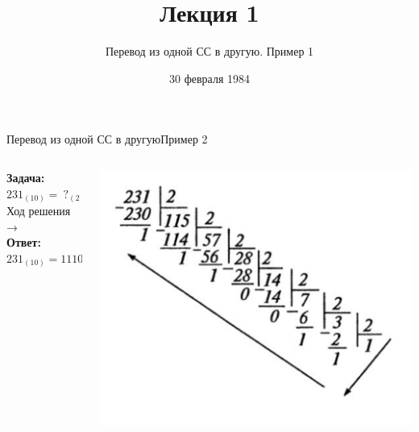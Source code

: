\documentclass[t, 10pt, handout, aspectratio=169]{beamer}
\title[]{Лекция 1}
\subtitle{Перевод из одной СС в другую. Пример 1}
\date[30/02/1984]{30 февраля 1984}
\begin{document}

\begin{frame}
  \titlepage
\end{frame}


\begin{frame}{Перевод из одной СС в другую}{Пример 2}
  \begin{columns}[2]
    \begin{column}{.5\textwidth}
        \textbf{Задача:} $ 231_{(10)} = \ ?_{(2)} $
        \\[1.2cm]
        Ход решения →
        \\[1.2cm]
        \textbf{Ответ:} $231_{(10)} = 11100111_{(2)}$
    \end{column}
    \begin{column}{.5\textwidth}
        \vspace{-0.5cm}
        \includegraphics[width=\textwidth, scale=0.4]{logos/division_inf.png}
    \end{column}
  \end{columns}
\end{frame}
\end{document}
